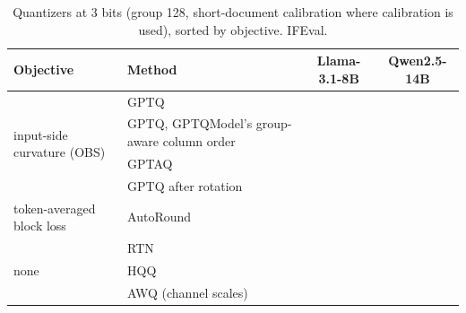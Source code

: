 \begin{table}[t]
\caption{Quantizers at 3 bits (group 128, short-document calibration where calibration is used), sorted by objective. IFEval.}
\label{tab:methods}
\begin{center}
\small
\begin{tabular}{llcc}
\toprule
Objective & Method & Llama-3.1-8B & Qwen2.5-14B \\
\midrule
\multirow{4}{*}{input-side curvature (OBS)}
 & GPTQ                    & \LgptqIF{}  & \QgptqIF{} \\
 & GPTQ, GPTQModel's group-aware column order & \LibLIF{} & \LibQIF{} \\
 & GPTAQ                   & \LgptaqIF{} & \QgptaqIF{} \\
 & GPTQ after rotation     & \LrotIF{}   & \QrotIF{} \\
\midrule
token-averaged block loss & AutoRound & \LarIF{} & \QarIF{} \\
\midrule
\multirow{3}{*}{none}
 & RTN                     & \LrtnIF{}   & \QrtnIF{} \\
 & HQQ                     & \LhqqIF{}   & \QhqqIF{} \\
 & AWQ (channel scales)    & \LawqIF{}   & \QawqIF{} \\
\bottomrule
\end{tabular}
\end{center}
\end{table}
